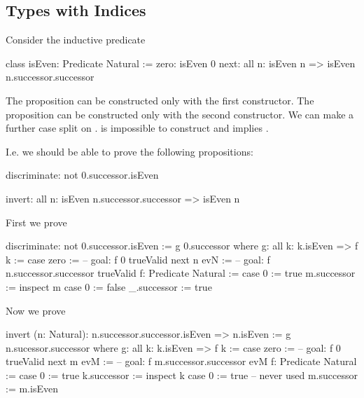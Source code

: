 \subsection{Types with Indices}

Consider the inductive predicate

\begin{alba}
    class
        isEven: Predicate Natural
    :=
        zero: isEven 0
        next: all n: isEven n => isEven n.successor.successor
\end{alba}

The proposition  can be constructed only with the first
constructor. The proposition  can be
constructed only with the second constructor. We can make a further case split
on .   is impossible to construct and
 implies .

I.e. we should be able to prove the following propositions:

\begin{alba}
    discriminate: not 0.successor.isEven

    invert: all n: isEven n.successor.successor => isEven n
\end{alba}


\noindent First we prove 
%
\begin{alba}
    discriminate: not 0.successor.isEven
    :=
        g 0.successor
        where
            g: all k: k.isEven => f k :=
                case
                    zero :=
                        -- goal: f 0
                        trueValid
                    next n evN :=
                        -- goal: f n.successor.successor
                        trueValid
            f: Predicate Natural :=
                case
                    0 :=
                        true
                    m.successor :=
                        inspect m case
                            0 :=
                                false
                            _.successor :=
                                true
\end{alba}




\noindent Now we prove 
%
\begin{alba}
    invert (n: Natural): n.successor.successor.isEven => n.isEven
    :=
        g n.sucessor.successor
        where
            g: all k: k.isEven => f k :=
                case
                    zero :=
                        -- goal: f 0
                        trueValid
                    next m evM :=
                        -- goal: f m.successor.successor
                        evM
            f: Predicate Natural :=
                case
                    0 :=
                        true
                    k.successor :=
                        inspect k case
                            0 :=
                                true -- never used
                            m.successor :=
                                m.isEven
\end{alba}




